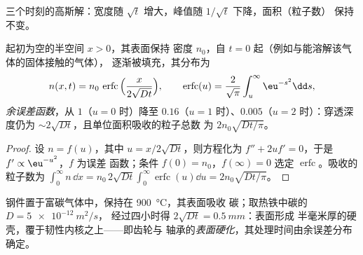 \begin{omfigure}

{\small 三个时刻的高斯解：宽度随
$\sqrt t$ 增大，峰值随 $1/\sqrt t$ 下降，面积（粒子数）
保持不变。}
\end{omfigure}

\begin{proposition}[表面浓度恒定]\label{prop:b2:particle-diffusion:erfc}
起初为空的半空间 $x > 0$，其表面保持
密度 $n_0$，自 $t = 0$ 起（例如与能溶解该气体的固体接触的气体），
逐渐被填充，其分布为
\[
n(x,t) = n_0\,\operatorname{erfc}\Big(\frac{x}{2\sqrt{Dt}}\Big),
\qquad
\operatorname{erfc}(u) = \frac{2}{\sqrt\pi}\int_u^{\infty}\eu^{-s^2}\dd s,
\]
\emph{余误差函数}，从 $1$（$u =
0$ 时）降至 $0.16$（$u = 1$ 时）、$0.005$（$u = 2$ 时）：穿透深度仍为
$\sim 2\sqrt{Dt}$，且单位面积吸收的粒子总数
为 $2n_0\sqrt{Dt/\pi}$。
\end{proposition}

\begin{proof}
设 $n = f(u)$，其中 $u = x/2\sqrt{Dt}$，则方程化为
$f'' + 2uf' = 0$，于是 $f' \propto \eu^{-u^2}$，$f$ 为误差
函数；条件 $f(0) = n_0$，$f(\infty) = 0$ 选定
$\operatorname{erfc}$。吸收的粒子数为 $\int_0^\infty n\,\dd x =
n_0\,2\sqrt{Dt}\int_0^\infty\operatorname{erfc}(u)\dd u = 2n_0\sqrt{Dt/\pi}$。
\end{proof}

\begin{example}[钢件硬化]\label{ex:b2:particle-diffusion:carburising}
钢件置于富碳气体中，保持在 \qty{900}{\celsius}，其表面吸收
碳；取热铁中碳的 $D = \qty{5e-12}{m^2/s}$，
经过四小时得 $2\sqrt{Dt} = \qty{0.5}{mm}$：表面形成
半毫米厚的硬壳，覆于韧性内核之上——即齿轮与
轴承的\emph{表面硬化}，其处理时间由余误差分布确定。
\end{example}

